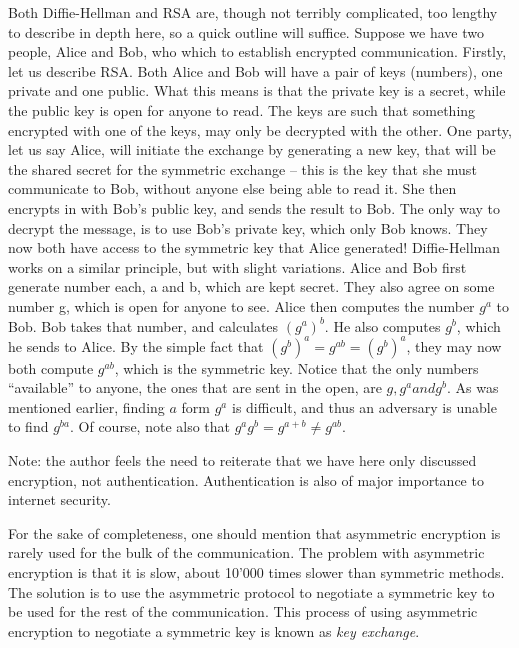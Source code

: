 \documentclass[conference]{IEEEtran}
\begin{document}
Both Diffie-Hellman and RSA are, though not terribly complicated, too lengthy to describe in depth here, so a quick outline will suffice.
Suppose we have two people, Alice and Bob, who which to establish encrypted communication.
Firstly, let us describe RSA.
Both Alice and Bob will have a pair of keys (numbers), one private and one public.
What this means is that the private key is a secret, while the public key is open for anyone to read.
The keys are such that something encrypted with one of the keys, may only be decrypted with the other.
One party, let us say Alice, will initiate the exchange by generating a new key, that will be the shared secret for the symmetric exchange -- this is the key that she must communicate to Bob, without anyone else being able to read it.
She then encrypts in with Bob's public key, and sends the result to Bob.
The only way to decrypt the message, is to use Bob's private key, which only Bob knows.
They now both have access to the symmetric key that Alice generated!
Diffie-Hellman works on a similar principle, but with slight variations.
Alice and Bob first generate number each, a and b, which are kept secret.
They also agree on some number g, which is open for anyone to see.
Alice then computes the number $g^a$ to Bob.
Bob takes that number, and calculates $(g^a)^b$.
He also computes $g^b$, which he sends to Alice.
By the simple fact that $(g^b)^a = g^{ab} = (g^b)^a$, they may now both compute $g^{ab}$, which is the symmetric key.
Notice that the only numbers ``available'' to anyone, the ones that are sent in the open, are $g, g^a and g^b$.
As was mentioned earlier, finding $a$ form $g^a$ is difficult, and thus an adversary is unable to find $g^{ba}$.
Of course, note also that $g^a g^b = g^{a+b}\neq g^{ab}$.


Note: the author feels the need to reiterate that we have here only discussed encryption, not authentication. Authentication is also of major importance to internet security.


For the sake of completeness, one should mention that asymmetric encryption is rarely used for the bulk of the communication.
The problem with asymmetric encryption is that it is slow, about 10'000 times slower than symmetric methods.
The solution is to use the asymmetric protocol to negotiate a symmetric key to be used for the rest of the communication.
This process of using asymmetric encryption to negotiate a symmetric key is known as \emph{key exchange}.
\end{document}
